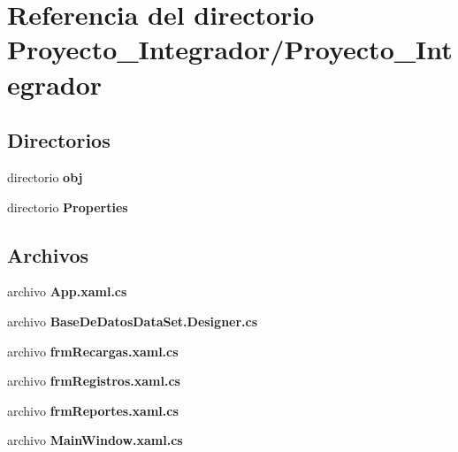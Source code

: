\section{Referencia del directorio Proyecto\-\_\-\-Integrador/\-Proyecto\-\_\-\-Integrador}
\label{dir_d329289ccd329d2abb0e830c2c5cc60a}
\subsection*{Directorios}
\begin{DoxyCompactItemize}
\item 
directorio {\bf obj}
\item 
directorio {\bf Properties}
\end{DoxyCompactItemize}
\subsection*{Archivos}
\begin{DoxyCompactItemize}
\item 
archivo {\bf App.\-xaml.\-cs}
\item 
archivo {\bf Base\-De\-Datos\-Data\-Set.\-Designer.\-cs}
\item 
archivo {\bf frm\-Recargas.\-xaml.\-cs}
\item 
archivo {\bf frm\-Registros.\-xaml.\-cs}
\item 
archivo {\bf frm\-Reportes.\-xaml.\-cs}
\item 
archivo {\bf Main\-Window.\-xaml.\-cs}
\end{DoxyCompactItemize}
